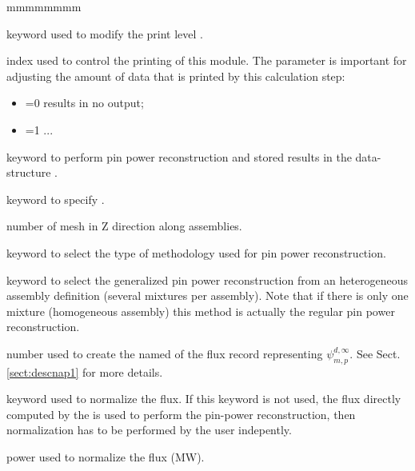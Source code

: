 \begin{ListeDeDescription}{mmmmmmmm}

\item[\moc{EDIT}] keyword used to modify the print level .

\item[\dusa{iprint}] index used to control the printing of this module. The
 parameter is important for adjusting the amount of data that is
printed by this calculation step:

\begin{itemize}

\item {}=0 results in no output;

\item {}=1 ...

\end{itemize}

\item[\moc{PPR}] keyword to perform pin power reconstruction and stored results in the  data-structure .

\item[\moc{NZASS}] keyword to specify . 

\item[\dusa{nzass}] number of mesh in Z direction along assemblies. 

\item[\moc{METH}] keyword to select the type of methodology used for pin power reconstruction.

\item[\moc{GPPR}] keyword to select the generalized pin power reconstruction from an heterogeneous assembly definition (several mixtures per assembly). Note that if there is only one mixture (homogeneous assembly) this method is actually the regular pin power reconstruction.

\item[\dusa{ifx}] number used to create the named of the flux record representing $\psi_{m,p}^{d,\infty}$. See Sect. \ref{sect:descnap1} for more details.

\item[\moc{POWER}] keyword used to normalize the flux. If this keyword is not used, the flux directly computed by the  is used to perform the pin-power reconstruction,  then normalization has to be performed by the user indepently. 

\item[\dusa{pow}] power used to normalize the flux (MW). 

\end{ListeDeDescription}

